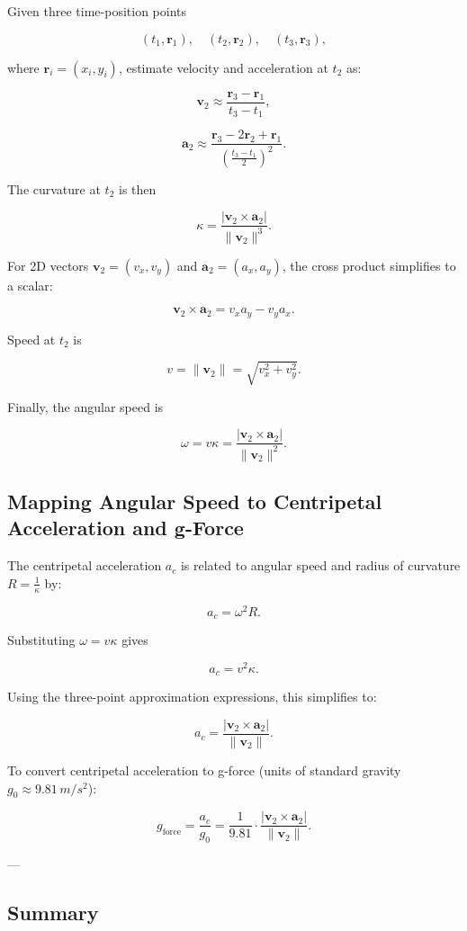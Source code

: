 \documentclass{article}
\begin{document}
	Given three time-position points
	
	\[
	(t_1, \bm{r}_1), \quad (t_2, \bm{r}_2), \quad (t_3, \bm{r}_3),
	\]
	
	where $\bm{r}_i = (x_i, y_i)$, estimate velocity and acceleration at $t_2$ as:
	
	\[
	\bm{v}_2 \approx \frac{\bm{r}_3 - \bm{r}_1}{t_3 - t_1},
	\]
	
	\[
	\bm{a}_2 \approx \frac{\bm{r}_3 - 2 \bm{r}_2 + \bm{r}_1}{\left(\frac{t_3 - t_1}{2}\right)^2}.
	\]
	
	The curvature at $t_2$ is then
	
	\[
	\kappa = \frac{\left| \bm{v}_2 \times \bm{a}_2 \right|}{\|\bm{v}_2\|^3}.
	\]
	
	For 2D vectors $\bm{v}_2 = (v_x, v_y)$ and $\bm{a}_2 = (a_x, a_y)$, the cross product simplifies to a scalar:
	
	\[
	\bm{v}_2 \times \bm{a}_2 = v_x a_y - v_y a_x.
	\]
	
	Speed at $t_2$ is
	
	\[
	v = \|\bm{v}_2\| = \sqrt{v_x^2 + v_y^2}.
	\]
	
	Finally, the angular speed is
	
	\[
	\omega = v \kappa = \frac{|\bm{v}_2 \times \bm{a}_2|}{\|\bm{v}_2\|^2}.
	\]
	
	\subsection*{Mapping Angular Speed to Centripetal Acceleration and g-Force}
	
	The centripetal acceleration $a_c$ is related to angular speed and radius of curvature $R = \frac{1}{\kappa}$ by:
	
	\[
	a_c = \omega^2 R.
	\]
	
	Substituting $\omega = v \kappa$ gives
	
	\[
	a_c = v^2 \kappa.
	\]
	
	Using the three-point approximation expressions, this simplifies to:
	
	\[
	a_c = \frac{|\bm{v}_2 \times \bm{a}_2|}{\|\bm{v}_2\|}.
	\]
	
	To convert centripetal acceleration to g-force (units of standard gravity $g_0 \approx 9.81\, m/s^2$):
	
	\[
	\boxed{
		g_{\text{force}} = \frac{a_c}{g_0} = \frac{1}{9.81} \cdot \frac{|\bm{v}_2 \times \bm{a}_2|}{\|\bm{v}_2\|}.
	}
	\]
	
	---
	
	\subsection*{Summary}
	
\end{document}
